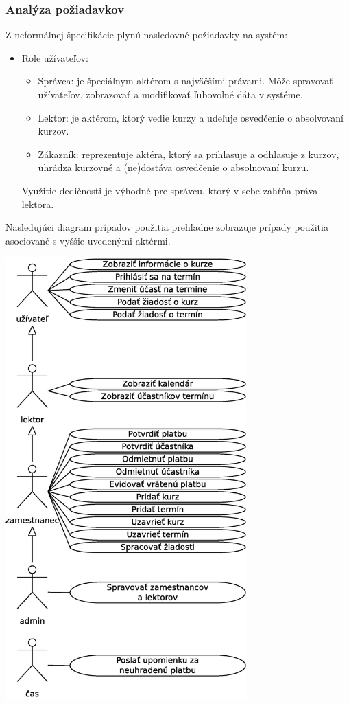 \documentclass[12pt,a4paper,titlepage,final]{report}
\begin{document}
	\subsubsection{Analýza požiadavkov}
Z neformálnej špecifikácie plynú nasledovné požiadavky na systém:
		\begin{itemize}
			\item Role užívateľov:
			\begin{itemize}
				\item Správca: je špeciálnym aktérom s najväčšími právami. Môže spravovať užívateľov, zobrazovať a modifikovať ľubovolné dáta v systéme.
				\item Lektor: je aktérom, ktorý vedie kurzy a udeľuje osvedčenie o absolvovaní kurzov.
				\item Zákazník: reprezentuje aktéra, ktorý sa prihlasuje a odhlasuje z kurzov, uhrádza kurzovné a (ne)dostáva osvedčenie o absolnovaní kurzu.
			\end{itemize}
Využitie dedičnosti je výhodné pre správcu, ktorý v sebe zahŕňa práva lektora.
		\end{itemize}
Nasledujúci diagram prípadov použitia prehľadne zobrazuje prípady použitia asociované s vyššie uvedenými aktérmi.
		\begin{center}
			\captionsetup{type=figure}
			\includegraphics[height=17cm]{img/use_case.eps}
		\end{center}
\end{document}
